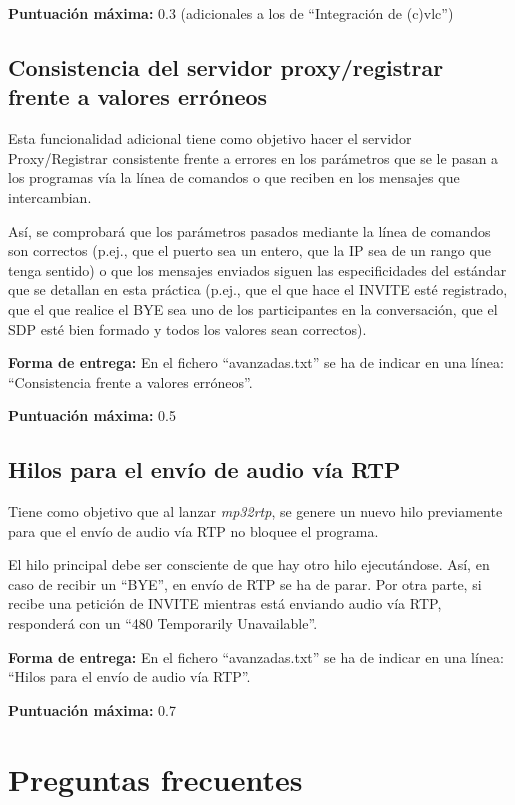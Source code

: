 \documentclass[a4paper,11pt]{article}
\begin{document}
  {\bf Puntuación máxima:} 0.3 (adicionales a los de ``Integración de (c)vlc'')


\subsection*{Consistencia del servidor proxy/registrar frente a valores erróneos}

Esta funcionalidad adicional tiene como objetivo hacer el servidor Proxy/Registrar consistente frente a errores en los parámetros que se le pasan a los programas vía la línea de comandos o que reciben en los mensajes que intercambian. 

Así, se comprobará que los parámetros pasados mediante la línea de comandos son correctos (p.ej., que el puerto sea un entero, que la IP sea de un rango que tenga sentido) o que los mensajes enviados siguen las especificidades del estándar que se detallan en esta práctica (p.ej., que el que hace el INVITE esté registrado, que el que realice el BYE sea uno de los participantes en la conversación, que el SDP esté bien formado y todos los valores sean correctos).

  {\bf Forma de entrega:} En el fichero ``avanzadas.txt'' se ha de indicar en una línea: ``Consistencia frente a valores erróneos''.

  {\bf Puntuación máxima:} 0.5



\subsection*{Hilos para el envío de audio vía RTP}

Tiene como objetivo que al lanzar \emph{mp32rtp}, se genere un nuevo hilo previamente para que el envío de audio vía RTP no bloquee el programa.

El hilo principal debe ser consciente de que hay otro hilo ejecutándose. Así, en caso de recibir un ``BYE'', en envío de RTP se ha de parar. Por otra parte, si recibe una petición de INVITE mientras está enviando audio vía RTP, responderá con un ``480 Temporarily Unavailable''.

  {\bf Forma de entrega:} En el fichero ``avanzadas.txt'' se ha de indicar en una línea: ``Hilos para el envío de audio vía RTP''.

  {\bf Puntuación máxima:} 0.7


\newpage
\section{Preguntas frecuentes}
\end{document}

